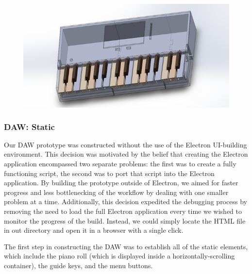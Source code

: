 \begin{figure}[h!]
  \centering
  \includegraphics[width=0.8\linewidth]{image/FinalModel2.png}
  \caption{}
  \label{fig:final_model2}
\end{figure}
\clearpage

\subsubsection{DAW: Static}

Our DAW prototype was constructed without the use of the Electron UI-building environment. This
decision was motivated by the belief that creating the Electron application encompassed two
separate problems: the first was to create a fully functioning script, the second was to port that
script into the Electron application. By building the prototype outside of Electron, we aimed for
faster progress and less bottlenecking of the workflow by dealing with one smaller problem at a
time. Additionally, this decision expedited the debugging process by removing the need to load
the full Electron application every time we wished to monitor the progress of the build. Instead,
we could simply locate the HTML file in out directory and open it in a browser with a single click.

The first step in constructing the DAW was to establish all of the static elements, which include
the piano roll (which is displayed inside a horizontally-scrolling container), the guide keys, and
the menu buttons.


